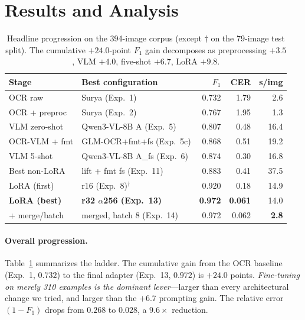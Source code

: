 \section{Results and Analysis}
\label{sec:results}

\begin{table}[t]
\centering
\small
\setlength{\tabcolsep}{3pt}
\begin{tabular}{@{}llrrr@{}}
\toprule
Stage & Best configuration & $F_1$ & CER & s/img \\
\midrule
OCR raw            & Surya (Exp.~1)              & 0.732 & 1.79 & 2.6 \\
OCR + preproc      & Surya (Exp.~2)              & 0.767 & 1.95 & 1.3 \\
VLM zero-shot      & Qwen3-VL-8B A (Exp.~5)      & 0.807 & 0.48 & 16.4 \\
OCR-VLM + fmt      & GLM-OCR+fmt+fs (Exp.~5c)    & 0.868 & 0.51 & 19.2 \\
VLM 5-shot         & Qwen3-VL-8B A\_fs (Exp.~6)  & 0.874 & 0.30 & 16.8 \\
Best non-LoRA      & lift + fmt fs (Exp.~11)     & 0.883 & 0.41 & 37.5 \\
LoRA (first)       & r16 (Exp.~8)$^{\dagger}$    & 0.920 & 0.18 & 14.9 \\
\textbf{LoRA (best)} & \textbf{r32 $\alpha$256 (Exp.~13)} & \textbf{0.972} & \textbf{0.061} & 14.0 \\
\;\;+ merge/batch  & merged, batch 8 (Exp.~14)   & 0.972 & 0.062 & \textbf{2.8} \\
\bottomrule
\end{tabular}
\caption{Headline progression on the 394-image corpus (except $\dagger$ on the
79-image test split). The cumulative $+24.0$-point $F_1$ gain decomposes as
preprocessing $+3.5$, VLM $+4.0$, five-shot $+6.7$, LoRA $+9.8$.}
\label{tab:progression}
\end{table}

\paragraph{Overall progression.}
Table~\ref{tab:progression} summarizes the ladder. The cumulative gain from the
OCR baseline (Exp.~1, $0.732$) to the final adapter (Exp.~13, $0.972$) is
$+24.0$ points. \emph{Fine-tuning on merely 310 examples is the dominant
lever}---larger than every architectural change we tried, and larger than the
$+6.7$ prompting gain. The relative error $(1{-}F_1)$ drops from $0.268$ to
$0.028$, a $9.6\times$ reduction.

